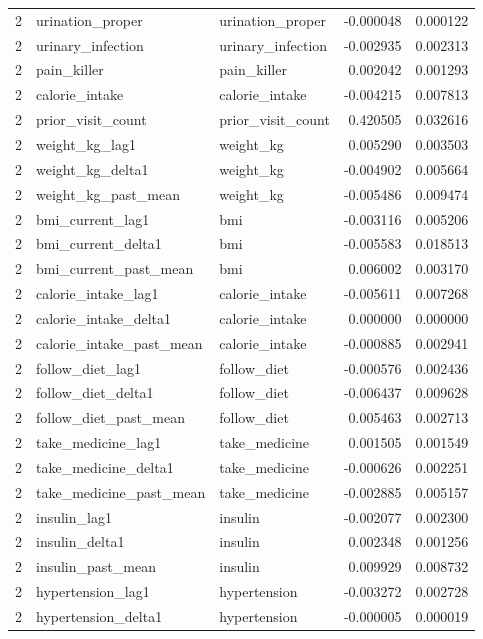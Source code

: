 \begin{longtable}{rllrr}
2 & urination\_proper & urination\_proper & -0.000048 & 0.000122 \\
2 & urinary\_infection & urinary\_infection & -0.002935 & 0.002313 \\
2 & pain\_killer & pain\_killer & 0.002042 & 0.001293 \\
2 & calorie\_intake & calorie\_intake & -0.004215 & 0.007813 \\
2 & prior\_visit\_count & prior\_visit\_count & 0.420505 & 0.032616 \\
2 & weight\_kg\_lag1 & weight\_kg & 0.005290 & 0.003503 \\
2 & weight\_kg\_delta1 & weight\_kg & -0.004902 & 0.005664 \\
2 & weight\_kg\_past\_mean & weight\_kg & -0.005486 & 0.009474 \\
2 & bmi\_current\_lag1 & bmi & -0.003116 & 0.005206 \\
2 & bmi\_current\_delta1 & bmi & -0.005583 & 0.018513 \\
2 & bmi\_current\_past\_mean & bmi & 0.006002 & 0.003170 \\
2 & calorie\_intake\_lag1 & calorie\_intake & -0.005611 & 0.007268 \\
2 & calorie\_intake\_delta1 & calorie\_intake & 0.000000 & 0.000000 \\
2 & calorie\_intake\_past\_mean & calorie\_intake & -0.000885 & 0.002941 \\
2 & follow\_diet\_lag1 & follow\_diet & -0.000576 & 0.002436 \\
2 & follow\_diet\_delta1 & follow\_diet & -0.006437 & 0.009628 \\
2 & follow\_diet\_past\_mean & follow\_diet & 0.005463 & 0.002713 \\
2 & take\_medicine\_lag1 & take\_medicine & 0.001505 & 0.001549 \\
2 & take\_medicine\_delta1 & take\_medicine & -0.000626 & 0.002251 \\
2 & take\_medicine\_past\_mean & take\_medicine & -0.002885 & 0.005157 \\
2 & insulin\_lag1 & insulin & -0.002077 & 0.002300 \\
2 & insulin\_delta1 & insulin & 0.002348 & 0.001256 \\
2 & insulin\_past\_mean & insulin & 0.009929 & 0.008732 \\
2 & hypertension\_lag1 & hypertension & -0.003272 & 0.002728 \\
2 & hypertension\_delta1 & hypertension & -0.000005 & 0.000019 \\

\end{longtable}
